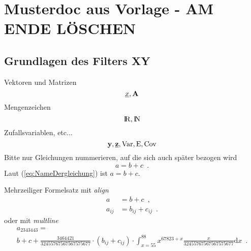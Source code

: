 \section{Musterdoc aus Vorlage - AM ENDE LÖSCHEN}

\subsection{Grundlagen des Filters XY}
Vektoren und Matrizen
%
\begin{equation*}
	\underline{x}, {\mathbf A}
\end{equation*}
%
Mengenzeichen
%
\begin{equation*}
	\mathrm{I\hspace{-2pt}R}, \mathrm{I\hspace{-2pt}N}
\end{equation*}
%
Zufallsvariablen, etc...
%
\begin{equation*}
	{\mathbf y}, {\underline{{\mathbf z}}},
	\mathrm{Var}, \mathrm{E}, \mathrm{Cov}
\end{equation*}
%
Bitte nur Gleichungen nummerieren, auf die sich auch später bezogen wird
%
\begin{equation}
	a = b +c \enspace .
	\label{eq:NameDergleichung}
\end{equation}
%
Laut (\ref{eq:NameDergleichung}) ist $a=b+c$.

Mehrzeiliger Formelsatz mit \emph{align}
%
\begin{align*}
	a &= b + c \enspace ,\\
	a_{ij} &= b_{ij} + c_{ij} \enspace .
\end{align*}
%
oder mit \emph{multline}
%
\begin{multline*}
	a_{2343443} = \\
	b + c + \frac{3464421}{32455767567567575677} 
	\cdot \left( b_{ij} + c_{ij} \right)
	\cdot \int_{x=55}^{88} x^{67823+x} \frac{x}{32455767567567575677} \text{d}x
	\enspace .
\end{multline*}
%

%
